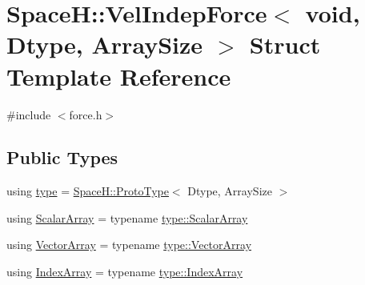 \hypertarget{struct_space_h_1_1_vel_indep_force_3_01void_00_01_dtype_00_01_array_size_01_4}{}\section{SpaceH\+:\+:Vel\+Indep\+Force$<$ void, Dtype, Array\+Size $>$ Struct Template Reference}
\label{struct_space_h_1_1_vel_indep_force_3_01void_00_01_dtype_00_01_array_size_01_4}


{\ttfamily \#include $<$force.\+h$>$}

\subsection*{Public Types}
\begin{DoxyCompactItemize}
\item 
using \mbox{\hyperlink{struct_space_h_1_1_vel_indep_force_3_01void_00_01_dtype_00_01_array_size_01_4_af262039ce202a8b59d4a8dda2aa55e42}{type}} = \mbox{\hyperlink{struct_space_h_1_1_proto_type}{Space\+H\+::\+Proto\+Type}}$<$ Dtype, Array\+Size $>$
\item 
using \mbox{\hyperlink{struct_space_h_1_1_vel_indep_force_3_01void_00_01_dtype_00_01_array_size_01_4_abac00e98d91b617794c41acf2a4ee4d5}{Scalar\+Array}} = typename \mbox{\hyperlink{struct_space_h_1_1_proto_type_a09ef91dc8a37a044c403f5a833044725}{type\+::\+Scalar\+Array}}
\item 
using \mbox{\hyperlink{struct_space_h_1_1_vel_indep_force_3_01void_00_01_dtype_00_01_array_size_01_4_ab547eb9c08979f28c5afafae93480702}{Vector\+Array}} = typename \mbox{\hyperlink{struct_space_h_1_1_proto_type_a622b8e122b33bb4966a02299fb7b82d6}{type\+::\+Vector\+Array}}
\item 
using \mbox{\hyperlink{struct_space_h_1_1_vel_indep_force_3_01void_00_01_dtype_00_01_array_size_01_4_ac09f6af9183141c8f56422420ce85302}{Index\+Array}} = typename \mbox{\hyperlink{struct_space_h_1_1_proto_type_a276a37c81faf08681b57e8082f3f6c1b}{type\+::\+Index\+Array}}
\end{DoxyCompactItemize}

